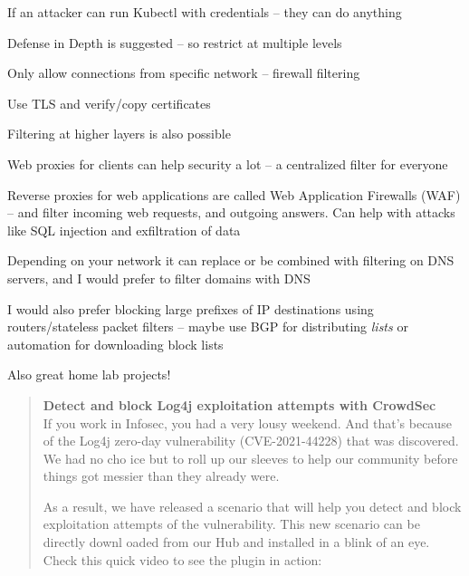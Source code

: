 \documentclass[Screen16to9,17pt]{foils}
\begin{document}
\begin{list2}
\item If an attacker can run Kubectl with credentials -- they can do anything
\item Defense in Depth is suggested -- so restrict at multiple levels
\item Only allow connections from specific network -- firewall filtering
\item Use TLS and verify/copy certificates
\end{list2}




Filtering at higher layers is also possible
\begin{list2}
\item Web proxies for clients can help security a lot -- a centralized filter for everyone

\item Reverse proxies for web applications are called
Web Application Firewalls (WAF) -- and filter incoming web requests, and outgoing answers. Can help with attacks like SQL injection and exfiltration of data
\item Depending on your network it can replace or be combined with filtering on DNS servers, and I would prefer to filter domains with DNS
\item I would also prefer blocking large prefixes of IP destinations using routers/stateless packet filters -- maybe use BGP for distributing \emph{lists} or automation for downloading block lists
\end{list2}

Also great home lab projects!



\begin{quote}
{\bf Detect and block Log4j exploitation attempts with CrowdSec}\\
If you work in Infosec, you had a very lousy weekend. And that’s because of the Log4j zero-day vulnerability (CVE-2021-44228) that was discovered. We had no cho
ice but to roll up our sleeves to help our community before things got messier than they already were.

As a result, we have released a scenario that will help you detect and block exploitation attempts of the vulnerability. This new scenario can be directly downl
oaded from our Hub and installed in a blink of an eye. Check this quick video to see the plugin in action:
\end{quote}
\end{document}
